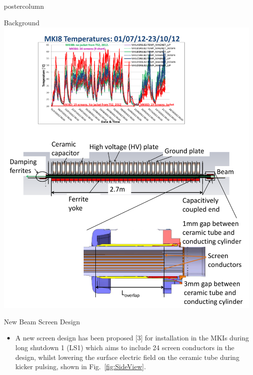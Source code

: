 \documentclass[final,hyperref={pdfpagelabels=false}]{beamer}
\begin{document}
\begin{frame}
\begin{columns}
\begin{column}{.49\textwidth}
\begin{beamercolorbox}[center,wd=\textwidth]{postercolumn}
\begin{minipage}[T]{.95\textwidth}
{	\begin{block}{Background}
\includegraphics[width=1.0\textwidth]{introductionPicture.pdf}
	\end{block}
 \vfill
\begin{block}{New Beam Screen Design}
\small{
\begin{itemize}
\item{A new screen design has been proposed [3] for installation in the MKIs during long shutdown 1 (LS1) which aims to include 24 screen conductors in the design, whilst lowering the surface electric field on the ceramic tube during kicker pulsing, shown in Fig.~\ref{fig:SideView}.}





\end{itemize}}
\end{block}}
\end{minipage}
\end{beamercolorbox}
\end{column}
\end{columns}
\end{frame}
\end{document}
